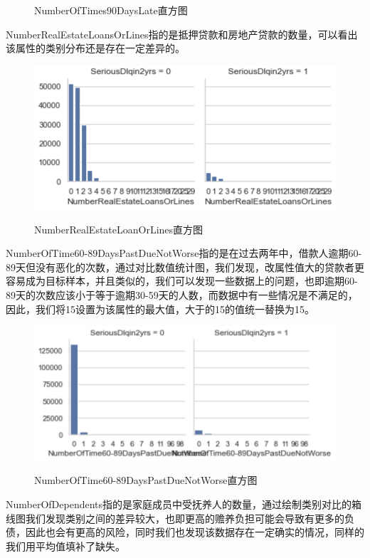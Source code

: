 \documentclass{zjureport}
\begin{document}
\begin{clause}
\begin{figure}[H]
    \caption{NumberOfTimes90DaysLate直方图}
    \end{figure}
     \item NumberRealEstateLoansOrLines指的是抵押贷款和房地产贷款的数量，可以看出该属性的类别分布还是存在一定差异的。
    \begin{figure}[H]
    \centering
    \includegraphics[scale=0.7]{figures/image10.png}\\
    \caption{NumberRealEstateLoanOrLines直方图}
    \end{figure}
     \item NumberOfTime60-89DaysPastDueNotWorse指的是在过去两年中，借款人逾期60-89天但没有恶化的次数，通过对比数值统计图，我们发现，改属性值大的贷款者更容易成为目标样本，并且类似的，我们可以发现一些数据上的问题，也即逾期60-89天的次数应该小于等于逾期30-59天的人数，而数据中有一些情况是不满足的，因此，我们将15设置为该属性的最大值，大于的15的值统一替换为15。
    \begin{figure}[H]
    \centering
    \includegraphics[scale=0.55]{figures/image11.png}\\
    \caption{NumberOfTime60-89DaysPastDueNotWorse直方图}
    \end{figure}
     \item NumberOfDependents指的是家庭成员中受抚养人的数量，通过绘制类别对比的箱线图我们发现类别之间的差异较大，也即更高的赡养负担可能会导致有更多的负债，因此也会有更高的风险，同时我们也发现该数据存在一定确实的情况，同样的我们用平均值填补了缺失。

\end{clause}
\end{document}
